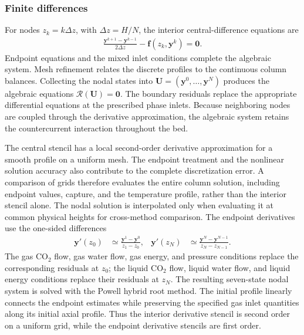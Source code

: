 \subsubsection{Finite differences}
For nodes $z_k=k\Delta z$, with $\Delta z=H/N$, the interior central-difference equations are
\begin{align}
\frac{\mathbf y^{k+1}-\mathbf y^{k-1}}{2\Delta z}
-\mathbf f(z_k,\mathbf y^k)=\mathbf0.
\end{align}
Endpoint equations and the mixed inlet conditions complete the algebraic system.
Mesh refinement relates the discrete profiles to the continuous column balances.
Collecting the nodal states into $\mathbf U=(\mathbf y^0,\ldots,\mathbf y^N)$ produces the algebraic equations $\mathcal R(\mathbf U)=\mathbf0$.
The boundary residuals replace the appropriate differential equations at the prescribed phase inlets.
Because neighboring nodes are coupled through the derivative approximation, the algebraic system retains the countercurrent interaction throughout the bed.

The central stencil has a local second-order derivative approximation for a smooth profile on a uniform mesh.
The endpoint treatment and the nonlinear solution accuracy also contribute to the complete discretization error.
A comparison of grids therefore evaluates the entire column solution, including endpoint values, capture, and the temperature profile, rather than the interior stencil alone.
The nodal solution is interpolated only when evaluating it at common physical heights for cross-method comparison.
The endpoint derivatives use the one-sided differences
\begin{align}
\mathbf y'(z_0)&\simeq\frac{\mathbf y^1-\mathbf y^0}{z_1-z_0},&
\mathbf y'(z_N)&\simeq\frac{\mathbf y^N-\mathbf y^{N-1}}{z_N-z_{N-1}}.
\label{eq:fd-endpoints}
\end{align}
The gas CO$_2$ flow, gas water flow, gas energy, and pressure conditions replace the corresponding residuals at $z_0$; the liquid CO$_2$ flow, liquid water flow, and liquid energy conditions replace their residuals at $z_N$.
The resulting seven-state nodal system is solved with the Powell hybrid root method.
The initial profile linearly connects the endpoint estimates while preserving the specified gas inlet quantities along its initial axial profile.
Thus the interior derivative stencil is second order on a uniform grid, while the endpoint derivative stencils are first order.

